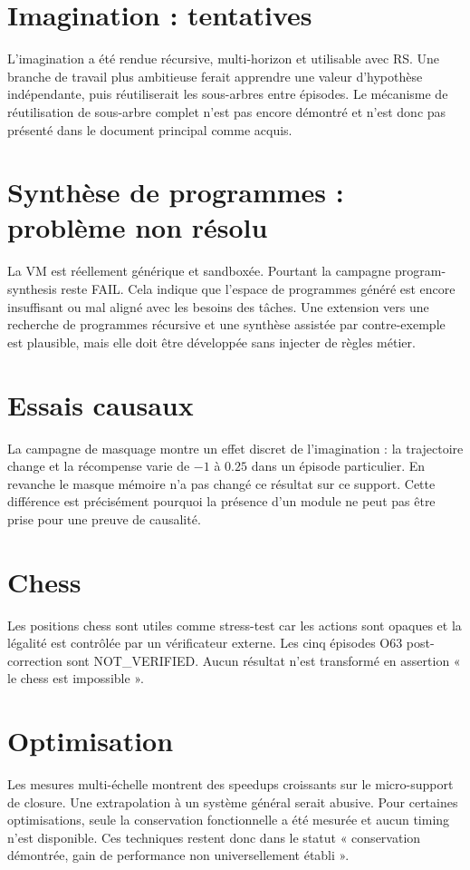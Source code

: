 \documentclass[11pt,a4paper]{article}
\begin{document}
\section{Imagination : tentatives}
L’imagination a été rendue récursive, multi-horizon et utilisable avec RS. Une branche de travail plus ambitieuse ferait apprendre une valeur d’hypothèse indépendante, puis réutiliserait les sous-arbres entre épisodes. Le mécanisme de réutilisation de sous-arbre complet n’est pas encore démontré et n’est donc pas présenté dans le document principal comme acquis.

\section{Synthèse de programmes : problème non résolu}
La VM est réellement générique et sandboxée. Pourtant la campagne program-synthesis reste FAIL. Cela indique que l’espace de programmes généré est encore insuffisant ou mal aligné avec les besoins des tâches. Une extension vers une recherche de programmes récursive et une synthèse assistée par contre-exemple est plausible, mais elle doit être développée sans injecter de règles métier.

\section{Essais causaux}
La campagne de masquage montre un effet discret de l’imagination : la trajectoire change et la récompense varie de $-1$ à $0.25$ dans un épisode particulier. En revanche le masque mémoire n’a pas changé ce résultat sur ce support. Cette différence est précisément pourquoi la présence d’un module ne peut pas être prise pour une preuve de causalité.

\section{Chess}
Les positions chess sont utiles comme stress-test car les actions sont opaques et la légalité est contrôlée par un vérificateur externe. Les cinq épisodes O63 post-correction sont NOT\_VERIFIED. Aucun résultat n’est transformé en assertion « le chess est impossible ».

\section{Optimisation}
Les mesures multi-échelle montrent des speedups croissants sur le micro-support de closure. Une extrapolation à un système général serait abusive. Pour certaines optimisations, seule la conservation fonctionnelle a été mesurée et aucun timing n’est disponible. Ces techniques restent donc dans le statut « conservation démontrée, gain de performance non universellement établi ».
\end{document}
